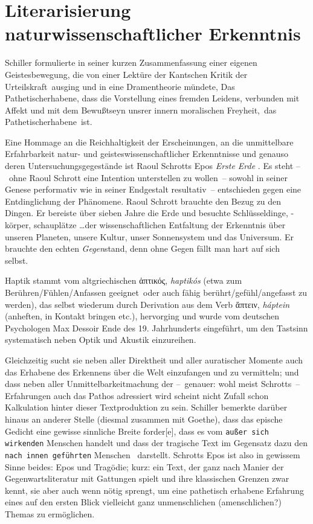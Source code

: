 \chapter*{Literarisierung naturwissenschaftlicher
  Erkenntnis}\label{ch:Literarisierung}
Schiller formulierte in seiner kurzen Zusammenfassung einer eigenen
  Geistesbewegung, die von einer Lektüre der Kantschen \glqq Kritik der
  Urteilskraft\grqq\ ausging und in eine Dramentheorie mündete, \glqq Das
  Pathetischerhabene\grqq, dass die \glqq Vorstellung eines fremden Leidens,
  verbunden mit Affekt und mit dem Bewu\ss tseyn unsrer innern moralischen
  Freyheit,\grqq\ das \glqq Pathetischerhabene\grqq\ ist.

Eine Hommage an die Reichhaltigkeit der Erscheinungen, an die unmittelbare
  Erfahrbarkeit natur- und geisteswissenschaftlicher Erkenntnisse und genauso
  deren Untersuchungsgegestände ist Raoul Schrotts Epos \emph{Erste Erde}
  \citep{Schrott2016ErsteErde}.
Es steht --~ohne Raoul Schrott eine Intention unterstellen zu wollen~--
  sowohl in seiner Genese performativ wie in seiner Endgestalt resultativ~--
  entschieden gegen eine Entdinglichung der Phänomene. Raoul Schrott brauchte
  den Bezug zu den Dingen. Er bereiste über sieben Jahre die Erde und besuchte
  Schlüsseldinge, -körper, schauplätze \ldots der wissenschaftlichen
  Entfaltung der Erkenntnis über unseren Planeten, unsere Kultur, unser
  Sonnensystem und das Universum. Er brauchte den echten \emph{Gegen}stand,
  \glqq denn ohne Gegen fällt man hart auf sich selbst.\grqq\ \citep[S. 60]{Han2016}

Haptik stammt vom altgriechischen \textgreek{ἁπτικός}, \emph{haptik\'os}
  (etwa \glqq zum Berühren/Fühlen/Anfassen geeignet\grqq\ oder auch \glqq fähig
  berührt/gefühl/angefasst zu werden\grqq), das selbst wiederum durch
  Derivation aus dem Verb \textgreek{ἅπτειν}, \emph{h\'aptein} (anheften, in
  Kontakt bringen etc.), hervorging und wurde vom deutschen Psychologen Max
  Dessoir Ende des 19. Jahrhunderts eingeführt, um den Tastsinn systematisch
  neben Optik und Akustik einzureihen.

Gleichzeitig sucht sie neben aller Direktheit und aller auratischer Momente
  auch das Erhabene des Erkennens über die Welt einzufangen und zu vermitteln;
  und dass neben aller Unmittelbarkeitmachung der --~genauer: wohl meist
  Schrotts~-- Erfahrungen auch das Pathos adressiert wird scheint nicht Zufall
  schon Kalkulation hinter dieser Textproduktion zu sein.
Schiller bemerkte darüber hinaus an anderer Stelle (diesmal zusammen mit
  Goethe), dass das epische Gedicht \glqq eine gewisse sinnliche Breite
  forder[e]\grqq, dass es vom \glqq\texttt{au\ss er sich wirkenden} Menschen
  handelt und dass der tragische Text im Gegensatz dazu den \glqq\texttt{nach
  innen geführten} Menschen \grqq\ darstellt.
Schrotts Epos ist also in gewissem Sinne beides: Epos und Tragödie; kurz: ein
  Text, der ganz nach Manier der Gegenwartsliteratur mit Gattungen spielt und
  ihre klassischen Grenzen zwar kennt, sie aber auch wenn nötig sprengt, um
  eine pathetisch erhabene Erfahrung eines auf den ersten Blick vielleicht
  ganz unmenschlichen (amenschlichen?) Themas zu ermöglichen. 

